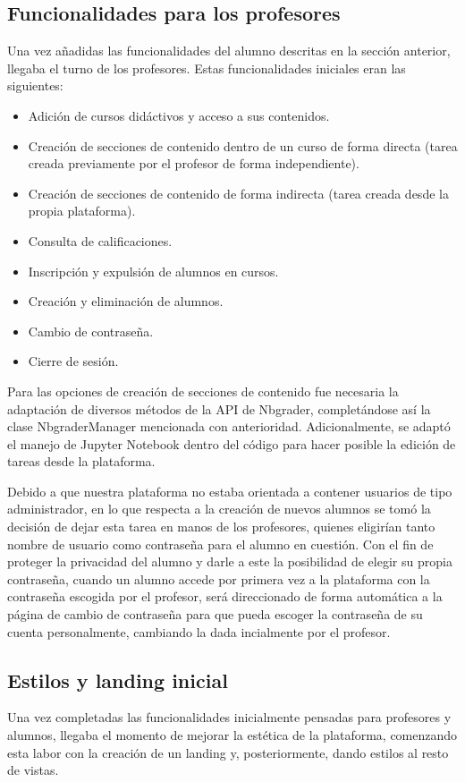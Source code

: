 \subsection{Funcionalidades para los profesores}
Una vez añadidas las funcionalidades del alumno descritas en la sección anterior, llegaba el turno de los profesores. Estas funcionalidades iniciales eran las siguientes:
\begin{itemize}
\item Adición de cursos didáctivos y acceso a sus contenidos.
\item Creación de secciones de contenido dentro de un curso de forma directa (tarea creada previamente por el profesor de forma independiente).
\item Creación de secciones de contenido de forma indirecta (tarea creada desde la propia plataforma).
\item Consulta de calificaciones.
\item Inscripción y expulsión de alumnos en cursos.
\item Creación y eliminación de alumnos.
\item Cambio de contraseña.
\item Cierre de sesión.
\end{itemize}
Para las opciones de creación de secciones de contenido fue necesaria la adaptación de diversos métodos de la API de Nbgrader, completándose así la clase NbgraderManager mencionada con anterioridad. Adicionalmente, se adaptó el manejo de Jupyter Notebook dentro del código para hacer posible la edición de tareas desde la plataforma.

Debido a que nuestra plataforma no estaba orientada a contener usuarios de tipo administrador, en lo que respecta a la creación de nuevos alumnos se tomó la decisión de dejar esta tarea en manos de los profesores, quienes eligirían tanto nombre de usuario como contraseña para el alumno en cuestión. Con el fin de proteger la privacidad del alumno y darle a este la posibilidad de elegir su propia contraseña, cuando un alumno accede por primera vez a la plataforma con la contraseña escogida por el profesor, será direccionado de forma automática a la página de cambio de contraseña para que pueda escoger la contraseña de su cuenta personalmente, cambiando la dada incialmente por el profesor.
 
\subsection{Estilos y landing inicial}
Una vez completadas las funcionalidades inicialmente pensadas para profesores y alumnos, llegaba el momento de mejorar la estética de la plataforma, comenzando esta labor con la creación de un landing y, posteriormente, dando estilos al resto de vistas.

